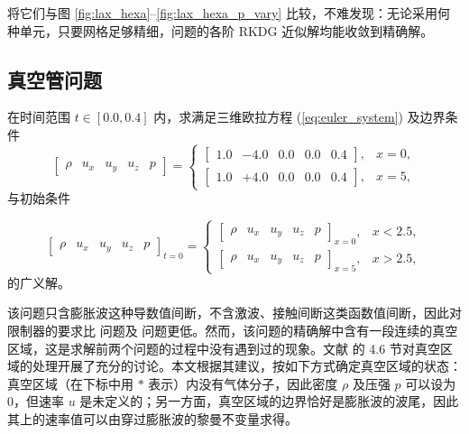 将它们与图 \ref{fig:lax_hexa}–\ref{fig:lax_hexa_p_vary} 比较，不难发现：无论采用何种单元，只要网格足够精细，问题的各阶
RKDG 近似解均能收敛到精确解。

\subsection{真空管问题}
\begin{problem}
[真空管]\label{prob:=00771F=007A7A=007BA1}在时间范围 $t\in[0.0,0.4]$
内，求满足三维欧拉方程 (\ref{eq:euler_system}) 及边界条件
\begin{equation}
\begin{bmatrix}\rho & u_{x} & u_{y} & u_{z} & p\end{bmatrix}=\begin{cases}
\begin{bmatrix}1.0 & -4.0 & 0.0 & 0.0 & 0.4\end{bmatrix}, & x=0,\\
\begin{bmatrix}1.0 & +4.0 & 0.0 & 0.0 & 0.4\end{bmatrix}, & x=5,
\end{cases}
\end{equation}
与初始条件

\begin{equation}
\begin{bmatrix}\rho & u_{x} & u_{y} & u_{z} & p\end{bmatrix}_{t=0}=\begin{cases}
\begin{bmatrix}\rho & u_{x} & u_{y} & u_{z} & p\end{bmatrix}_{x=0}, & x<2.5,\\
\begin{bmatrix}\rho & u_{x} & u_{y} & u_{z} & p\end{bmatrix}_{x=5}, & x>2.5,
\end{cases}
\end{equation}
的广义解。
\end{problem}

该问题只含膨胀波这种导数值间断，不含激波、接触间断这类函数值间断，因此对限制器的要求比 问题及
问题更低。然而，该问题的精确解中含有一段连续的真空区域，这是求解前两个问题的过程中没有遇到过的现象。文献 \cite{Toro_2009}
的 4.6 节对真空区域的处理开展了充分的讨论。本文根据其建议，按如下方式确定真空区域的状态：真空区域（在下标中用 $*$ 表示）内没有气体分子，因此密度
$\rho$ 及压强 $p$ 可以设为 $0$，但速率 $u$ 是未定义的；另一方面，真空区域的边界恰好是膨胀波的波尾，因此其上的速率值可以由穿过膨胀波的黎曼不变量求得。

